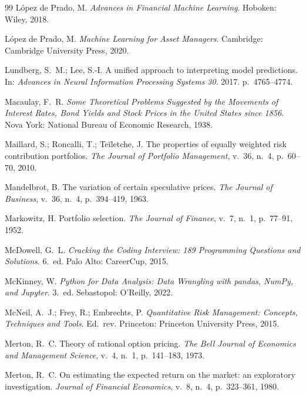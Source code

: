\begin{thebibliography}{99}
López de Prado, M. \emph{Advances in Financial Machine Learning}. Hoboken: Wiley, 2018.

López de Prado, M. \emph{Machine Learning for Asset Managers}. Cambridge: Cambridge University Press, 2020.

Lundberg, S.~M.; Lee, S.-I. A unified approach to interpreting model predictions. In: \emph{Advances in Neural Information Processing Systems 30}. 2017. p.~4765--4774.

Macaulay, F.~R. \emph{Some Theoretical Problems Suggested by the Movements of Interest Rates, Bond Yields and Stock Prices in the United States since 1856}. Nova York: National Bureau of Economic Research, 1938.

Maillard, S.; Roncalli, T.; Teïletche, J. The properties of equally weighted risk contribution portfolios. \emph{The Journal of Portfolio Management}, v.~36, n.~4, p.~60--70, 2010.

Mandelbrot, B. The variation of certain speculative prices. \emph{The Journal of Business}, v.~36, n.~4, p.~394--419, 1963.

Markowitz, H. Portfolio selection. \emph{The Journal of Finance}, v.~7, n.~1, p.~77--91, 1952.

McDowell, G.~L. \emph{Cracking the Coding Interview: 189 Programming Questions and Solutions}. 6.~ed. Palo Alto: CareerCup, 2015.

McKinney, W. \emph{Python for Data Analysis: Data Wrangling with pandas, NumPy, and Jupyter}. 3.~ed. Sebastopol: O'Reilly, 2022.

McNeil, A.~J.; Frey, R.; Embrechts, P. \emph{Quantitative Risk Management: Concepts, Techniques and Tools}. Ed.~rev. Princeton: Princeton University Press, 2015.

Merton, R.~C. Theory of rational option pricing. \emph{The Bell Journal of Economics and Management Science}, v.~4, n.~1, p.~141--183, 1973.

Merton, R.~C. On estimating the expected return on the market: an exploratory investigation. \emph{Journal of Financial Economics}, v.~8, n.~4, p.~323--361, 1980.


\end{thebibliography}
